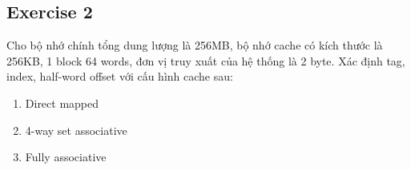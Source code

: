 \subsection{Exercise 2}
Cho bộ nhớ chính tổng dung lượng là 256MB, bộ nhớ cache có kích thước là 256KB, 1 block 64 words, đơn vị truy xuất của hệ thống là 2 byte.
Xác định tag, index, half-word offset với cấu hình cache sau:
\begin{enumerate}[label=(\alph*), itemsep=0pt]
  \item Direct mapped
  \item 4-way set associative
  \item Fully associative
\end{enumerate}

